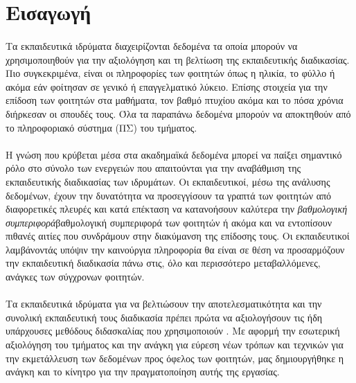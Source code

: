 \documentclass[12pt,a4paper,final]{article}
\begin{document}
\section{Εισαγωγή}
\paragraph{}
Τα εκπαιδευτικά ιδρύματα διαχειρίζονται δεδομένα τα οποία μπορούν να χρησιμοποιηθούν για την αξιολόγηση και τη βελτίωση της εκπαιδευτικής διαδικασίας. Πιο συγκεκριμένα, είναι οι  πληροφορίες των φοιτητών όπως η ηλικία, το φύλλο ή ακόμα εάν φοίτησαν σε γενικό ή επαγγελματικό λύκειο. Επίσης στοιχεία για την επίδοση των φοιτητών στα μαθήματα, τον βαθμό πτυχίου ακόμα και το πόσα χρόνια διήρκεσαν οι σπουδές τους. Όλα τα παραπάνω δεδομένα μπορούν να αποκτηθούν από το πληροφοριακό σύστημα (ΠΣ) του τμήματος.
\paragraph{}
Η γνώση που κρύβεται μέσα στα ακαδημαϊκά δεδομένα μπορεί να παίξει σημαντικό ρόλο στο σύνολο των ενεργειών που απαιτούνται για την αναβάθμιση της εκπαιδευτικής διαδικασίας των ιδρυμάτων\foreignlanguage{english}{\cite{students_learning_case6}}. 
Οι εκπαιδευτικοί, μέσω της ανάλυσης δεδομένων\foreignlanguage{english}{\cite{miningEducation1}}, έχουν την δυνατότητα να προσεγγίσουν τα γραπτά των φοιτητών από διαφορετικές πλευρές και κατά επέκταση να κατανοήσουν καλύτερα την \textit{βαθμολογική συμπεριφορά}βαθμολογική συμπεριφορά των φοιτητών ή ακόμα και να εντοπίσουν  πιθανές αιτίες που συνδράμουν στην διακύμανση της επίδοσης τους. Οι εκπαιδευτικοί λαμβάνοντάς υπόψιν την καινούργια πληροφορία θα είναι σε θέση να προσαρμόζουν την εκπαιδευτική διαδικασία πάνω στις, όλο και περισσότερο μεταβαλλόμενες, ανάγκες των σύγχρονων φοιτητών.

\paragraph{}
Τα εκπαιδευτικά ιδρύματα  για να βελτιώσουν την αποτελεσματικότητα και την συνολική εκπαιδευτική τους διαδικασία πρέπει πρώτα να αξιολογήσουν τις ήδη υπάρχουσες μεθόδους διδασκαλίας που χρησιμοποιούν\foreignlanguage{english}{ \cite{educational_mining5}}. Με αφορμή την εσωτερική αξιολόγηση του τμήματος και την ανάγκη για εύρεση νέων  τρόπων και τεχνικών για την εκμετάλλευση των δεδομένων προς όφελος των φοιτητών, μας δημιουργήθηκε η ανάγκη και το κίνητρο για την  πραγματοποίηση αυτής της εργασίας.
\end{document}
